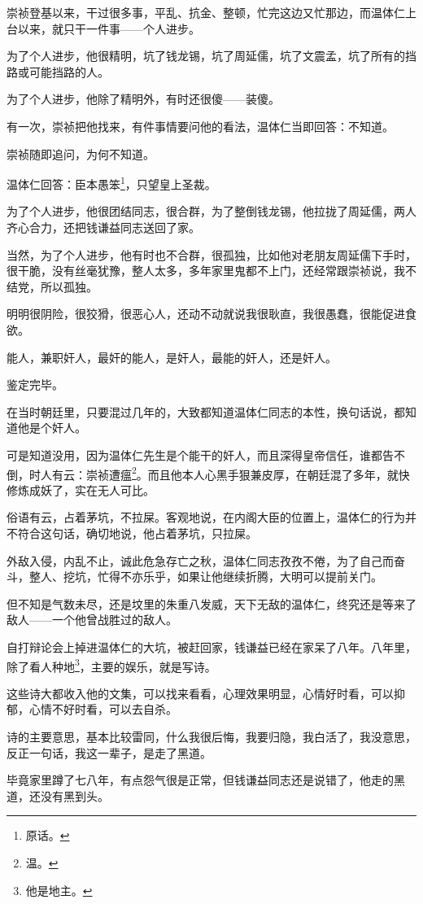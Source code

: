 \begin{multicols}{\theparacolNo}
崇祯登基以来，干过很多事，平乱、抗金、整顿，忙完这边又忙那边，而温体仁上台以来，就只干一件事——个人进步。

为了个人进步，他很精明，坑了钱龙锡，坑了周延儒，坑了文震孟，坑了所有的挡路或可能挡路的人。

为了个人进步，他除了精明外，有时还很傻——装傻。

有一次，崇祯把他找来，有件事情要问他的看法，温体仁当即回答：不知道。

崇祯随即追问，为何不知道。

温体仁回答：臣本愚笨\footnote{原话。}，只望皇上圣裁。

为了个人进步，他很团结同志，很合群，为了整倒钱龙锡，他拉拢了周延儒，两人齐心合力，还把钱谦益同志送回了家。

当然，为了个人进步，他有时也不合群，很孤独，比如他对老朋友周延儒下手时，很干脆，没有丝毫犹豫，整人太多，多年家里鬼都不上门，还经常跟崇祯说，我不结党，所以孤独。

明明很阴险，很狡猾，很恶心人，还动不动就说我很耿直，我很愚蠢，很能促进食欲。

能人，兼职奸人，最奸的能人，是奸人，最能的奸人，还是奸人。

鉴定完毕。

在当时朝廷里，只要混过几年的，大致都知道温体仁同志的本性，换句话说，都知道他是个奸人。

可是知道没用，因为温体仁先生是个能干的奸人，而且深得皇帝信任，谁都告不倒，时人有云：崇祯遭瘟\footnote{温。}。而且他本人心黑手狠兼皮厚，在朝廷混了多年，就快修炼成妖了，实在无人可比。

俗语有云，占着茅坑，不拉屎。客观地说，在内阁大臣的位置上，温体仁的行为并不符合这句话，确切地说，他占着茅坑，只拉屎。

外敌入侵，内乱不止，诚此危急存亡之秋，温体仁同志孜孜不倦，为了自己而奋斗，整人、挖坑，忙得不亦乐乎，如果让他继续折腾，大明可以提前关门。

但不知是气数未尽，还是坟里的朱重八发威，天下无敌的温体仁，终究还是等来了敌人——一个他曾战胜过的敌人。

自打辩论会上掉进温体仁的大坑，被赶回家，钱谦益已经在家呆了八年。八年里，除了看人种地\footnote{他是地主。}，主要的娱乐，就是写诗。

这些诗大都收入他的文集，可以找来看看，心理效果明显，心情好时看，可以抑郁，心情不好时看，可以去自杀。

诗的主要意思，基本比较雷同，什么我很后悔，我要归隐，我白活了，我没意思，反正一句话，我这一辈子，是走了黑道。

毕竟家里蹲了七八年，有点怨气很是正常，但钱谦益同志还是说错了，他走的黑道，还没有黑到头。


\end{multicols}
